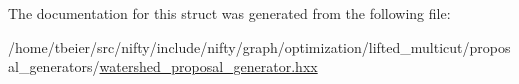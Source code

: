 The documentation for this struct was generated from the following file\+:\begin{DoxyCompactItemize}
\item 
/home/tbeier/src/nifty/include/nifty/graph/optimization/lifted\+\_\+multicut/proposal\+\_\+generators/\hyperlink{lifted__multicut_2proposal__generators_2watershed__proposal__generator_8hxx}{watershed\+\_\+proposal\+\_\+generator.\+hxx}\end{DoxyCompactItemize}
